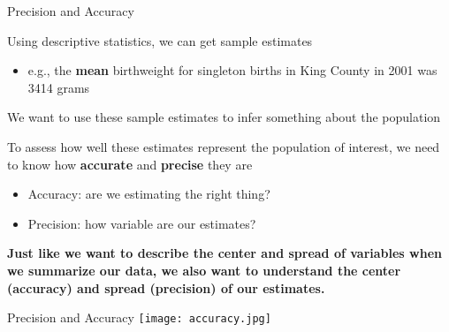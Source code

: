 \documentclass[10pt,t]{beamer}
\begin{document}
\begin{frame}{Precision and Accuracy}
	
\vspace{-3 mm}
	
Using descriptive statistics, we can get sample estimates
\vspace{0.3cm}
\begin{itemize}
	\item e.g., the \textbf{mean} birthweight for singleton births in King County in 2001 was 3414 grams
\end{itemize}
\vspace{0.3cm}
We want to use these sample estimates to infer something about the population 
\vspace{0.3cm}

To assess how well these estimates represent the population of interest, we need to know how \textbf{accurate} and \textbf{precise} they are

\vspace{0.3cm}
\begin{itemize}
	\item Accuracy: are we estimating the right thing?
	\item Precision: how variable are our estimates?
\end{itemize}
\vspace{0.3cm}
\textbf{Just like we want to describe the center and spread of variables when we summarize our data, we also want to understand the center (accuracy) and spread (precision) of our estimates.}
\end{frame}

\begin{frame}[c]{Precision and Accuracy}
\centering \texttt{[image: accuracy.jpg]}
\end{frame}
\end{document}
